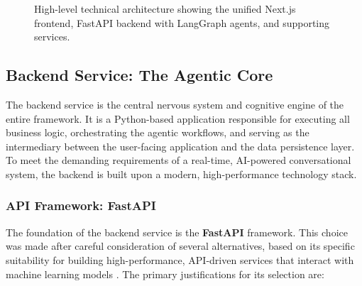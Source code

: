 \begin{figure}[h]
    \caption{High-level technical architecture showing the unified Next.js frontend, FastAPI backend with LangGraph agents, and supporting services.}
    \label{fig:system_architecture_diagram}
\end{figure}

\subsection{Backend Service: The Agentic Core}
\label{sec:backend_service}

The backend service is the central nervous system and cognitive engine of the entire framework. It is a Python-based application responsible for executing all business logic, orchestrating the agentic workflows, and serving as the intermediary between the user-facing application and the data persistence layer. To meet the demanding requirements of a real-time, AI-powered conversational system, the backend is built upon a modern, high-performance technology stack.

\subsubsection{API Framework: FastAPI}
\label{sec:api_framework}

The foundation of the backend service is the \textbf{FastAPI} framework. This choice was made after careful consideration of several alternatives, based on its specific suitability for building high-performance, API-driven services that interact with machine learning models \cite{ramirez2023fastapi, tiangolo2022fastapi}. The primary justifications for its selection are:

